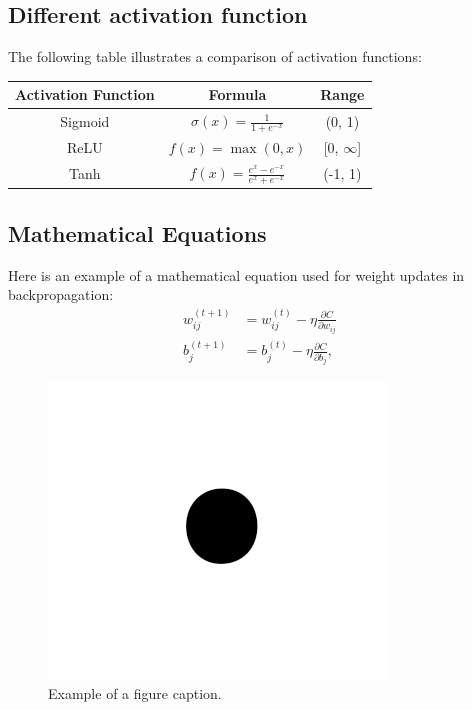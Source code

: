 \documentclass[conference]{IEEEtran}
\begin{document}
\subsection{Different activation function}
The following table illustrates a comparison of activation functions:
\begin{center}
    \vspace{1cm}
    \begin{tabular}{|c|c|c|}
        \hline
        \textbf{Activation Function} & \textbf{Formula} & \textbf{Range} \\[5px]
        \hline
        Sigmoid & \( \sigma(x) = \frac{1}{1 + e^{-x}} \) & (0, 1) \\[5px]
        \hline
        ReLU & \( f(x) = \max(0, x) \) & [0, \( \infty \)] \\[5px]
        \hline
        Tanh & \( f(x) = \frac{e^x - e^{-x}}{e^x + e^{-x}} \) & (-1, 1) \\[5px]
        \hline
    \end{tabular}
\end{center}

\subsection{Mathematical Equations}
Here is an example of a mathematical equation used for weight updates in backpropagation:
\begin{align}
    w_{ij}^{(t+1)} &= w_{ij}^{(t)} - \eta \frac{\partial C}{\partial w_{ij}} \\
    b_j^{(t+1)} &= b_j^{(t)} - \eta \frac{\partial C}{\partial b_j},
\end{align}

\begin{figure}[h]
\centerline{\includegraphics{fig1.png}}
\caption{Example of a figure caption.}
\label{fig}
\end{figure}
\end{document}
